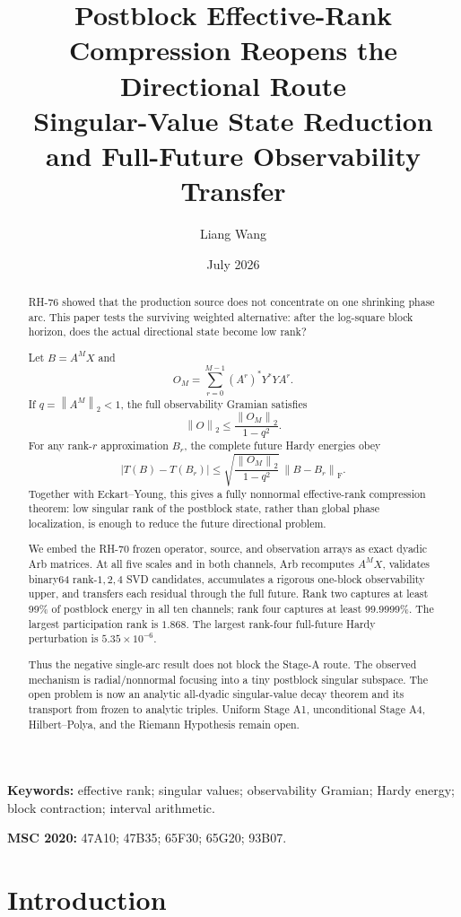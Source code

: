 \documentclass[11pt]{article}
\title{Postblock Effective-Rank Compression Reopens the Directional Route\\
\large Singular-Value State Reduction and Full-Future Observability Transfer}
\author{Liang Wang}
\date{July 2026}
\newcommand{\norm}[1]{\left\lVert#1\right\rVert}
\newcommand{\F}{\mathrm F}
\begin{document}
\maketitle

\begin{abstract}
RH-76 showed that the production source does not concentrate on one shrinking
phase arc.  This paper tests the surviving weighted alternative: after the
log-square block horizon, does the actual directional state become low rank?

Let $B=A^MX$ and
\[
 O_M=\sum_{r=0}^{M-1}(A^r)^*Y^*YA^r.
\]
If $q=\norm{A^M}_2<1$, the full observability Gramian satisfies
\[
 \norm O_2\le\frac{\norm{O_M}_2}{1-q^2}.
\]
For any rank-$r$ approximation $B_r$, the complete future Hardy energies obey
\[
 |T(B)-T(B_r)|
 \le\sqrt{\frac{\norm{O_M}_2}{1-q^2}}\,\norm{B-B_r}_{\F}.
\]
Together with Eckart--Young, this gives a fully nonnormal effective-rank
compression theorem: low singular rank of the postblock state, rather than
global phase localization, is enough to reduce the future directional problem.

We embed the RH-70 frozen operator, source, and observation arrays as exact
dyadic Arb matrices.  At all five scales and in both channels, Arb recomputes
$A^MX$, validates binary64 rank-$1,2,4$ SVD candidates, accumulates a rigorous
one-block observability upper, and transfers each residual through the full
future.  Rank two captures at least 99\% of postblock energy in all ten
channels; rank four captures at least 99.9999\%.  The largest participation
rank is $1.868$.  The largest rank-four full-future Hardy perturbation is
$5.35\times10^{-6}$.

Thus the negative single-arc result does not block the Stage-A route.  The
observed mechanism is radial/nonnormal focusing into a tiny postblock singular
subspace.  The open problem is now an analytic all-dyadic singular-value decay
theorem and its transport from frozen to analytic triples.  Uniform Stage A1,
unconditional Stage A4, Hilbert--Polya, and the Riemann Hypothesis remain open.
\end{abstract}

\noindent\textbf{Keywords:} effective rank; singular values; observability
Gramian; Hardy energy; block contraction; interval arithmetic.

\medskip
\noindent\textbf{MSC 2020:} 47A10; 47B35; 65F30; 65G20; 93B07.

\section{Introduction}
\end{document}
